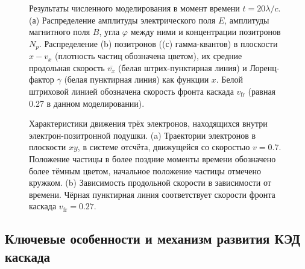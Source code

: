 \begin{figure}[h!]
    \caption[Результаты численного моделирования развития КЭД каскада в плоской волн]{\label{fig:ch2/field-structure} Результаты численного моделирования в момент времени ${t = 20 \lambda / c}$. (а) Распределение амплитуды электрического поля $E$, амплитуды магнитного поля $B$, угла $\varphi$ между ними и концентрации позитронов $N_p$. Распределение (b) позитронов ((с) гамма-квантов) в плоскости $x - v_{x}$ (плотность частиц обозначена цветом), их средние продольная скорость $\overline{v_x}$ (белая штрих-пунктирная линия) и Лоренц-фактор $\overline{\gamma}$ (белая пунктирная линия) как функции $x$. Белой штриховой линией обозначена скорость фронта каскада $v_\mathrm{fr}$ (равная 0.27 в данном моделировании).}
\end{figure}

\begin{figure}[h!]
    \caption[Характеристики движения отдельных электронов, находящихся внутри электрон-позитронной подушки.]{\label{fig:ch2/sec1/tracks} Характеристики движения трёх электронов, находящихся внутри электрон-позитронной подушки. (a) Траектории электронов в плоскости $xy$, в системе отсчёта, движущейся со скоростью $v=0.7$. Положение частицы в более поздние моменты времени обозначено более тёмным цветом, начальное положение частицы отмечено кружком. (b) Зависимость продольной скорости в зависимости от времени. Чёрная пунктирная линия соответствует скорости фронта каскада $v_\mathrm{fr} = 0.27$.}
\end{figure}

\subsection{Ключевые особенности и механизм развития КЭД каскада}
\label{sub:ch2/sec2/Mechanism}


